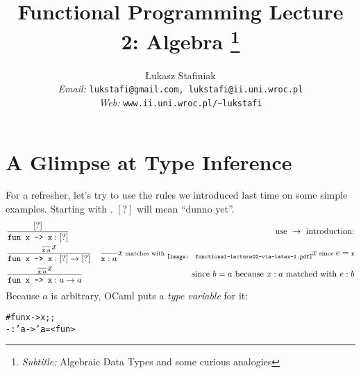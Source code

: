 \documentclass{article}
\newcommand{\tmem}[1]{{\em #1\/}}
\newcommand{\tmemail}[1]{\\ \textit{Email:} \texttt{#1}}
\newcommand{\tmhomepage}[1]{\\ \textit{Web:} \texttt{#1}}
\newcommand{\tmsubtitle}[1]{\thanks{\textit{Subtitle:} #1}}
\newcommand{\tmverbatim}[1]{\text{{\ttfamily{#1}}}}
\newenvironment{tmcode}[1][]{\begin{alltt} }{\end{alltt}}
\begin{document}
\title{Functional Programming}

\author{
  {\L}ukasz Stafiniak
  \tmemail{lukstafi@gmail.com, lukstafi@ii.uni.wroc.pl}
  \tmhomepage{www.ii.uni.wroc.pl/\~{}lukstafi}
}

\maketitle

\title{
  Lecture 2: Algebra
  \tmsubtitle{Algebraic Data Types and some curious analogies}
}

\maketitle

{\newpage}

\section{A Glimpse at Type Inference}

For a refresher, let's try to use the rules we introduced last time on some
simple examples. Starting with \tmverbatim{fun x -> x}. $[?]$ will mean
``dunno yet''.
\begin{eqnarray*}
  & \frac{[?]}{\text{\tmverbatim{fun x -> x}} : [?]} & \text{use }
  \rightarrow \text{ introduction:}\\
  & \frac{\frac{}{\text{\tmverbatim{x}} : a}
  \scriptsize{x}}{\text{\tmverbatim{fun x -> x}} : [?] \rightarrow [?]} &
  \frac{}{\text{\tmverbatim{x}} : a} \scriptsize{x} \text{ matches with }
  \hspace{-0.00839564475928112cm}\raisebox{-0.764310582139098\height}{\texttt{[image: functional-lecture02-via-latex-1.pdf]}}\hspace{-0.0236783418601602cm}
  \scriptsize{x} \text{ since } e = \text{\tmverbatim{x}}\\
  & \frac{\frac{}{\text{\tmverbatim{x}} : a}
  \scriptsize{x}}{\text{\tmverbatim{fun x -> x}} : a \rightarrow a} &
  \text{since } b = a \text{ because } x : a \text{ matched with } e : b
\end{eqnarray*}
Because $a$ is arbitrary, OCaml puts a {\tmem{type variable}} \tmverbatim{'a}
for it:
\begin{tmcode}
\# fun x -> x;;
- : 'a -> 'a = <fun>
\end{tmcode}
{\newpage}
\end{document}
